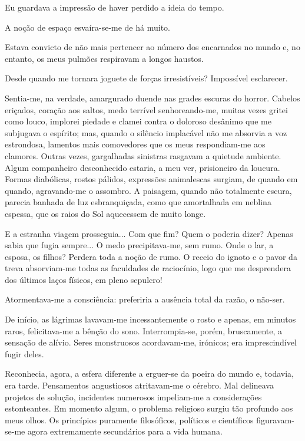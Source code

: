 \documentclass[portuguese,12pt,a4paper]{scrbook}
\begin{document}
	Eu guardava a impressão de haver perdido a ideia do tempo.
	
	A noção de espaço esvaíra-se-me de há muito.
	
	Estava convicto de não mais pertencer ao número dos encarnados no mundo e, no entanto, os meus pulmões respiravam a longos haustos.
	
	Desde quando me tornara joguete de forças irresistíveis? Impossível esclarecer.
	
	Sentia-me, na verdade, amargurado duende nas grades escuras do horror. Cabelos eriçados, coração aos saltos, medo terrível senhoreando-me, muitas vezes gritei como louco, implorei piedade e clamei contra o doloroso desânimo que me subjugava o espírito; mas, quando o silêncio implacável não me absorvia a voz estrondosa, lamentos mais comovedores que os meus respondiam-me aos clamores. Outras vezes, gargalhadas sinistras rasgavam a quietude ambiente. Algum companheiro desconhecido estaria, a meu ver, prisioneiro da loucura. Formas diabólicas, rostos pálidos, expressões animalescas surgiam, de quando em quando, agravando-me o assombro. A paisagem, quando não totalmente escura, parecia banhada de luz esbranquiçada, como que amortalhada em neblina espessa, que os raios do Sol aquecessem de muito longe.
	
	E a estranha viagem prosseguia... Com que fim? Quem o poderia dizer? Apenas sabia que fugia sempre... O medo precipitava-me, sem rumo. Onde o lar, a esposa, os filhos? Perdera toda a noção de rumo. O receio do ignoto e o pavor da treva absorviam-me todas as faculdades de raciocínio, logo que me desprendera dos últimos laços físicos, em pleno sepulcro!
	
	
	Atormentava-me a consciência: preferiria a ausência total da razão, o não-ser.
	
	De início, as lágrimas lavavam-me incessantemente o rosto e apenas, em minutos raros, felicitava-me a bênção do sono. Interrompia-se, porém, bruscamente, a sensação de alívio. Seres monstruosos acordavam-me, irónicos; era imprescindível fugir deles.
	
	Reconhecia, agora, a esfera diferente a erguer-se da poeira do mundo e, todavia, era tarde. Pensamentos angustiosos atritavam-me o cérebro. Mal delineava projetos de solução, incidentes numerosos impeliam-me a considerações estonteantes. Em momento algum, o problema religioso surgiu tão profundo aos meus olhos. Os princípios puramente filosóficos, políticos e científicos figuravam-se-me agora extremamente secundários para a vida humana.
	
\end{document}
